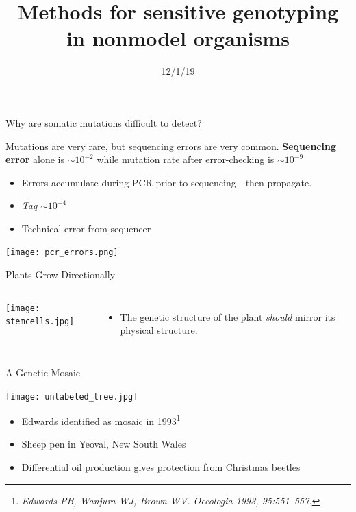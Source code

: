 \documentclass{beamer}
\title[Sensitive Genotyping]{Methods for sensitive genotyping in nonmodel organisms}
\date{12/1/19}
\author{Adam Orr\hskip 1em \faicon{twitter}@AdamJOrr}
\begin{document}
\frame{\titlepage}

\begin{frame}{Why are somatic mutations difficult to detect?}

\begin{block}{Mutations are very rare, but sequencing errors are very common.}
\textbf{Sequencing error} alone is \textbf{$\sim10^{-2}$} while mutation rate after error-checking is \textbf{$\sim10^{-9}$}
\end{block}

\begin{itemize}
\item Errors accumulate during PCR prior to sequencing - then propagate.
\item \textit{Taq} $\sim10^{-4}$
\item Technical error from sequencer
\end{itemize}

\texttt{[image: pcr\_errors.png]}

\end{frame}

\begin{frame}{Plants Grow Directionally}
\begin{columns}
		\texttt{[image: stemcells.jpg]}
		\begin{itemize}
			\item The genetic structure of the plant \textit{should} mirror its physical structure.
		\end{itemize}
\end{columns}
\end{frame}

\begin{frame}{A Genetic Mosaic}
	\begin{center}
	\texttt{[image: unlabeled\_tree.jpg]}
	\end{center}
	\begin{itemize}
		\item Edwards identified as mosaic in 1993\footnote{\textit{Edwards PB, Wanjura WJ, Brown WV. Oecologia 1993, 95:551–557.}}
		\item Sheep pen in Yeoval, New South Wales
		\item Differential oil production gives protection from Christmas beetles
	\end{itemize}
\end{frame}
\end{document}
